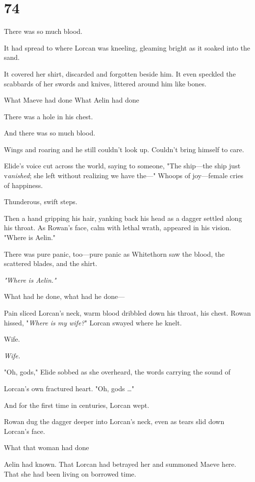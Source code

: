 
\chapter{74}

There was so much blood.

It had spread to where Lorcan was kneeling, gleaming bright as it soaked into the sand.

It covered her shirt, discarded and forgotten beside him. It even speckled the scabbards of her swords and knives, littered around him like bones.

What Maeve had done  What Aelin had done 

There was a hole in his chest.

And there was so much blood.

Wings and roaring and he still couldn't look up. Couldn't bring himself to care.

Elide's voice cut across the world, saying to someone, "The ship---the ship just v\emph{anished}; she left without realizing we have the---" Whoops of joy---female cries of happiness.

Thunderous, swift steps.

Then a hand gripping his hair, yanking back his head as a dagger settled along his throat. As Rowan's face, calm with lethal wrath, appeared in his vision. "Where is Aelin."

There was pure panic, too---pure panic as Whitethorn saw the blood, the scattered blades, and the shirt.

\emph{"Where is Aelin."}

What had he done, what had he done---

Pain sliced Lorcan's neck, warm blood dribbled down his throat, his chest. Rowan hissed, "\emph{Where is my wife?}" Lorcan swayed where he knelt.

Wife.

\emph{Wife.}

"Oh, gods," Elide sobbed as she overheard, the words carrying the sound of

Lorcan's own fractured heart. "Oh, gods \ldots"

And for the first time in centuries, Lorcan wept.

Rowan dug the dagger deeper into Lorcan's neck, even as tears slid down Lorcan's face.

What that woman had done 

Aelin had known. That Lorcan had betrayed her and summoned Maeve here. That she had been living on borrowed time.

